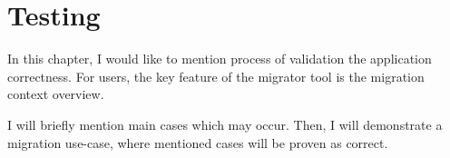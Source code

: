 \chapter{Testing}\label{cptr:testing}

In this chapter, I would like to mention process of validation the application correctness.
For users, the key feature of the migrator tool is the migration context overview.

I will briefly mention main cases which may occur.
Then, I will demonstrate a migration use-case, where mentioned cases will be proven as correct.



